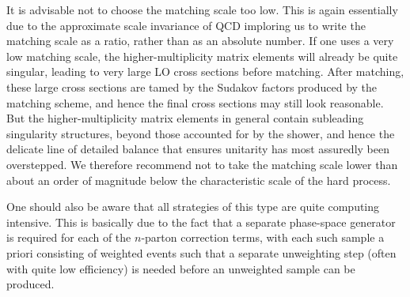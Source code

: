 %
%
%
%
It is advisable not to choose the matching scale too low. This is
again  essentially due to the approximate scale invariance of QCD
imploring us to 
write the matching scale as a ratio, rather than as an absolute
number. 
If one uses a
very low matching 
scale, the higher-multiplicity matrix elements will already be quite
singular, leading to very large LO cross sections before matching. 
After matching, these large cross sections are tamed by
the Sudakov factors produced by the matching scheme, and hence the
final cross sections may still look reasonable. But 
the higher-multiplicity matrix elements in
general contain subleading singularity structures, beyond those
accounted for by the shower, and hence the delicate
line of detailed balance that ensures unitarity has most
assuredly been overstepped. We therefore recommend not to take the 
matching scale lower than about an order of magnitude below the
 characteristic scale of the hard process. 

One should also be aware that all strategies of this type are 
quite computing intensive. This is basically due to the fact that 
a separate phase-space generator is required for each of the
$n$-parton correction terms, with each such sample a priori consisting
of weighted events such that a separate unweighting step (often with
quite low efficiency) is needed before an
unweighted sample can be produced. 

%
%
%
